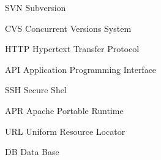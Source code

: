 \begin{siglas}
  \item[SVN] Subversion
  \item[CVS] Concurrent Versions System
  \item[HTTP] Hypertext Transfer Protocol
  \item[API] Application Programming Interface
  \item[SSH] Secure Shel
  \item[APR] Apache Portable Runtime
  \item[URL] Uniform Resource Locator
  \item[DB] Data Base


\end{siglas}
